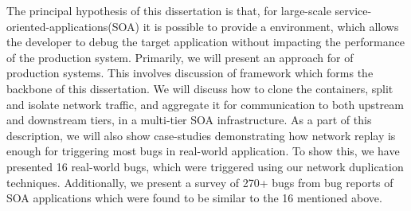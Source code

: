 
The principal hypothesis of this dissertation is that, for large-scale service-oriented-applications(SOA) it is possible to provide a \livedebugging environment, which allows the developer to debug the target application without impacting the performance of the production system.
Primarily, we will present an approach for \livedebugging of production systems.
This involves discussion of \parikshan framework which forms the backbone of this dissertation.
We will discuss how to clone the containers, split and isolate network traffic, and aggregate it for communication to both upstream and downstream tiers, in a multi-tier SOA infrastructure.
As a part of this description, we will also show case-studies demonstrating how network replay is enough for triggering most bugs in real-world application. 
To show this, we have presented 16 real-world bugs, which were triggered using our network duplication techniques. 
Additionally, we present a survey of 270+ bugs from bug reports of SOA applications which were found to be similar to the 16 mentioned above.

